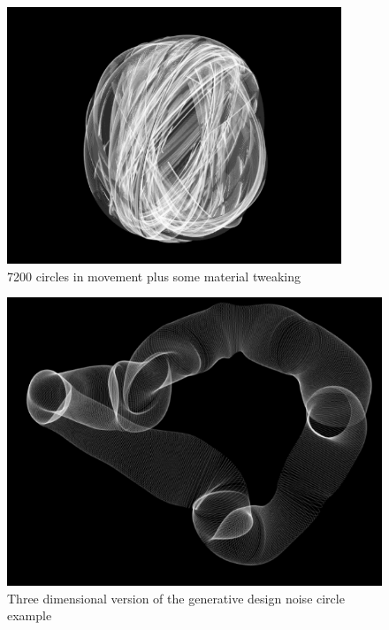\begin{figure}[H]
  \centering
  \includegraphics[width=10cm]{img/rings7200.PNG}
  \caption[shortCaption]
  {7200 circles in movement plus some material tweaking}
  \label{fig:label}
\end{figure}

\begin{figure}[H]
  \centering
  \includegraphics[width=\textwidth]{img/ggForms3d.PNG}
  \caption[shortCaption]
  {Three dimensional version of the generative design noise circle example}
  \label{fig:label}
\end{figure}



